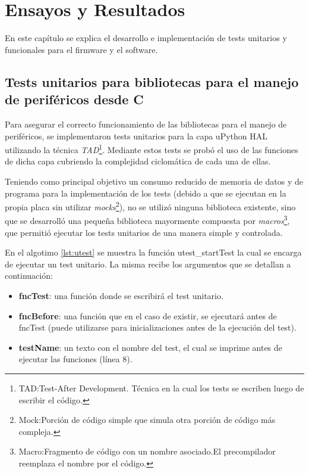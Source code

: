 
\chapter{Ensayos y Resultados} %
En este capítulo se explica el desarrollo e implementación de tests unitarios y funcionales para el firmware y el software.

\label{Chapter4} %


\section{Tests unitarios para bibliotecas para el manejo de periféricos desde C}
\label{sec:testUnitariosC}

Para asegurar el correcto funcionamiento de las bibliotecas para el manejo de periféricos, se implementaron tests unitarios para la capa uPython HAL utilizando la técnica \textit{TAD}\footnote{TAD:Test-After Development. Técnica en la cual los tests se escriben luego de escribir el código.}. Mediante estos tests se probó el uso de las funciones de dicha capa cubriendo la complejidad ciclomática de cada una de ellas.

Teniendo como principal objetivo un consumo reducido de memoria de datos y de programa para la implementación de los tests (debido a que se ejecutan en la propia placa sin utilizar \textit{mocks}\footnote{Mock:Porción de código simple que simula otra porción de código más compleja.}), no se utilizó ninguna biblioteca existente, sino que se desarrolló una pequeña biblioteca mayormente compuesta por \textit{macros}\footnote{Macro:Fragmento de código con un nombre asociado.El precompilador reemplaza el nombre por el código.}, que permitió ejecutar los tests unitarios de una manera simple y controlada.

En el algotimo \ref{lst:utest} se muestra la función utest\_startTest la cual se encarga de ejecutar un test unitario. La misma recibe los argumentos que se detallan a continuación:

\begin{itemize}
	\item \textbf{fncTest}: una función donde se escribirá el test unitario.
	\item \textbf{fncBefore}: una función que en el caso de existir, se ejecutará antes de fncTest (puede utilizarse para inicializaciones antes de la ejecución del test).
	\item \textbf{testName}: un texto con el nombre del test, el cual se imprime antes de ejecutar las funciones (línea 8).	
\end{itemize}
	
